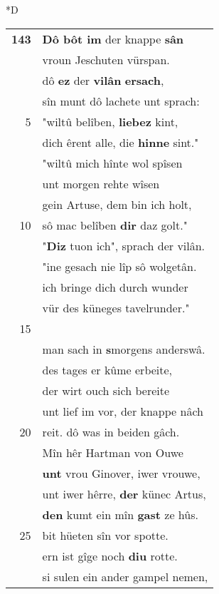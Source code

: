 \documentclass[8pt,a4paper,notitlepage]{article}
\begin{document}
\begin{table}[ht]
\begin{minipage}[t]{0.5\linewidth}
\small
\begin{center}*D
\end{center}
\begin{tabular}{rl}
\textbf{143} & \textbf{Dô bôt im} der knappe \textbf{sân}\\ 
 & vroun Jeschuten vürspan.\\ 
 & dô \textbf{ez} der \textbf{vilân} \textbf{ersach},\\ 
 & sîn munt dô lachete unt sprach:\\ 
5 & "wiltû belîben, \textbf{liebez} kint,\\ 
 & dich êrent alle, die \textbf{hinne} sint."\\ 
 & "wiltû mich hînte wol spîsen\\ 
 & unt morgen rehte wîsen\\ 
 & gein Artuse, dem bin ich holt,\\ 
10 & sô mac belîben \textbf{dir} daz golt."\\ 
 & "\textbf{Diz} tuon ich", sprach der vilân.\\ 
 & "ine gesach nie lîp sô wolgetân.\\ 
 & ich bringe dich durch wunder\\ 
 & vür des küneges tavelrunder."\\ 
15 & \textit{\begin{large}D\end{large}}ie naht beleip der knappe dâ,\\ 
 & man sach in \textbf{s}morgens anderswâ.\\ 
 & des tages er kûme erbeite,\\ 
 & der wirt ouch sich bereite\\ 
 & unt lief im vor, der knappe nâch\\ 
20 & reit. dô was in beiden gâch.\\ 
 & Mîn hêr Hartman von Ouwe\\ 
 & \textbf{unt} vrou Ginover, iwer vrouwe,\\ 
 & unt iwer hêrre, \textbf{der} künec Artus,\\ 
 & \textbf{den} kumt ein mîn \textbf{gast} ze hûs.\\ 
25 & bit hüeten sîn vor spotte.\\ 
 & ern ist gîge noch \textbf{diu} rotte.\\ 
 & si sulen ein ander gampel nemen,\\ 

\end{tabular}
\end{minipage}
\end{table}
\end{document}
